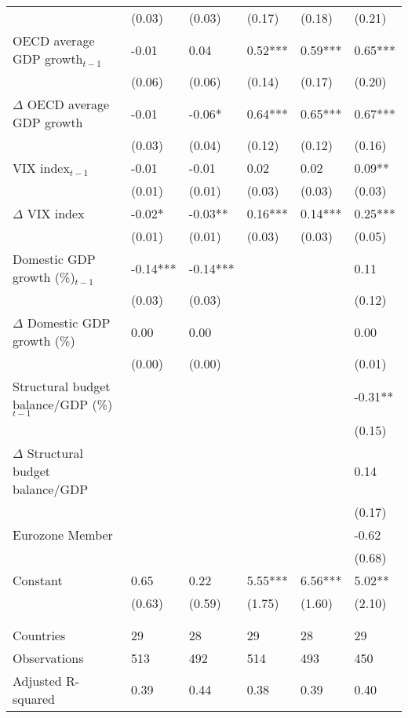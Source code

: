 {\begin{tabular}{lp{2cm}p{2cm}p{2cm}p{2cm}p{2cm}}
   & (0.03) & (0.03) & (0.17) & (0.18) & (0.21) \\ 
  OECD average GDP growth$_{t-1}$ & -0.01 & 0.04 & 0.52*** & 0.59*** & 0.65*** \\ 
   & (0.06) & (0.06) & (0.14) & (0.17) & (0.20) \\ 
  $\Delta$ OECD average GDP growth & -0.01 & -0.06* & 0.64*** & 0.65*** & 0.67*** \\ 
   & (0.03) & (0.04) & (0.12) & (0.12) & (0.16) \\ 
  VIX index$_{t-1}$ & -0.01 & -0.01 & 0.02 & 0.02 & 0.09** \\ 
   & (0.01) & (0.01) & (0.03) & (0.03) & (0.03) \\ 
  $\Delta$ VIX index & -0.02* & -0.03** & 0.16*** & 0.14*** & 0.25*** \\ 
   & (0.01) & (0.01) & (0.03) & (0.03) & (0.05) \\ 
  Domestic GDP growth (\%)$_{t-1}$ & -0.14*** & -0.14*** &  &  & 0.11 \\ 
   & (0.03) & (0.03) &  &  & (0.12) \\ 
  $\Delta$ Domestic GDP growth (\%) & 0.00 & 0.00 &  &  & 0.00 \\ 
   & (0.00) & (0.00) &  &  & (0.01) \\ 
  Structural budget balance/GDP (\%)$_{t-1}$ &  &  &  &  & -0.31** \\ 
   &  &  &  &  & (0.15) \\ 
  $\Delta$ Structural budget balance/GDP &  &  &  &  & 0.14 \\ 
   &  &  &  &  & (0.17) \\ 
  Eurozone Member &  &  &  &  & -0.62 \\ 
   &  &  &  &  & (0.68) \\ 
  Constant & 0.65 & 0.22 & 5.55*** & 6.56*** & 5.02** \\ 
   & (0.63) & (0.59) & (1.75) & (1.60) & (2.10) \\ 
   &  &  &  &  &  \\ 
   &  &  &  &  &  \\ 
  Countries & 29 & 28 & 29 & 28 & 29 \\ 
  Observations & 513 & 492 & 514 & 493 & 450 \\ 
  Adjusted R-squared & 0.39 & 0.44 & 0.38 & 0.39 & 0.40 \\ 
   \hline
\end{tabular}
}
